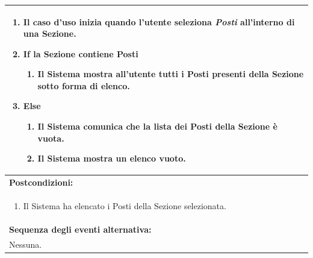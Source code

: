 \documentclass{article}
\begin{document}
\begin{table}[H]
\begin{tabular}{|p{\linewidth}|}
\begin{enumerate}
                            \item Il caso d'uso inizia quando l'utente seleziona \textit{Posti} all'interno di una Sezione.
                            \item \textbf{If} la Sezione contiene Posti
                            \begin{enumerate}
                                \item Il Sistema mostra all'utente tutti i Posti presenti della Sezione sotto forma di elenco.
                            \end{enumerate}
                            \item \textbf{Else}
                            \begin{enumerate}
                                \item Il Sistema comunica che la lista dei Posti della Sezione è vuota.
                                \item Il Sistema mostra un elenco vuoto.
                            \end{enumerate}				
                        \end{enumerate} \\
                        \hline
                        \cellcolor{gray!20}
                        \textbf{Postcondizioni:} \\
                        \cellcolor{gray!20}
                        \begin{minipage}{\linewidth}
                            \begin{enumerate}
                                \item Il Sistema ha elencato i Posti della Sezione selezionata.
                            \end{enumerate}
                        \end{minipage} \\
                        \hline
                        \textbf{Sequenza degli eventi alternativa:} \\
                        Nessuna. \\
                        \hline
                    \end{tabular}
                \end{table}
                
\end{document}
